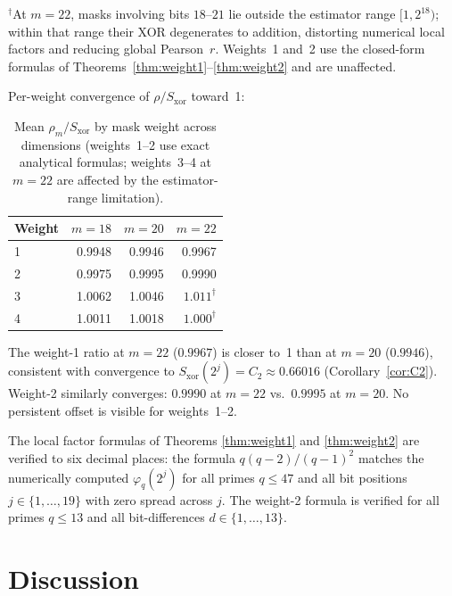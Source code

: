 \documentclass[11pt]{article}
\begin{document}
${}^\dagger$At $m=22$, masks involving bits $18$--$21$ lie outside the estimator
range $[1,2^{18})$; within that range their XOR degenerates to addition,
distorting numerical local factors and reducing global Pearson~$r$.
Weights~1 and~2 use the closed-form formulas of
Theorems~\ref{thm:weight1}--\ref{thm:weight2} and are unaffected.

Per-weight convergence of $\rho/S_{\mathrm{xor}}$ toward~1:

\begin{table}[h]
\centering
\caption{Mean $\rho_m/S_{\mathrm{xor}}$ by mask weight across dimensions
(weights~1--2 use exact analytical formulas;
weights~3--4 at $m=22$ are affected by the estimator-range limitation).}
\label{tab:byweight}
\begin{tabular}{lrrr}
\toprule
Weight & $m=18$ & $m=20$ & $m=22$ \\
\midrule
1 & 0.9948 & 0.9946 & 0.9967 \\
2 & 0.9975 & 0.9995 & 0.9990 \\
3 & 1.0062 & 1.0046 & $1.011^\dagger$ \\
4 & 1.0011 & 1.0018 & $1.000^\dagger$ \\
\bottomrule
\end{tabular}
\end{table}

The weight-1 ratio at $m=22$ ($0.9967$) is closer to~1 than at $m=20$ ($0.9946$),
consistent with convergence to $S_{\mathrm{xor}}(2^j) = C_2 \approx 0.66016$
(Corollary~\ref{cor:C2}).
Weight-2 similarly converges: $0.9990$ at $m=22$ vs.\ $0.9995$ at $m=20$.
No persistent offset is visible for weights~1--2.

The local factor formulas of Theorems \ref{thm:weight1} and \ref{thm:weight2}
are verified to six decimal places: the formula $q(q-2)/(q-1)^2$ matches
the numerically computed $\varphi_q(2^j)$ for all primes $q \leq 47$
and all bit positions $j \in \{1, \ldots, 19\}$ with zero spread across $j$.
The weight-2 formula is verified for all primes $q \leq 13$
and all bit-differences $d \in \{1, \ldots, 13\}$.

\section{Discussion}
\end{document}
